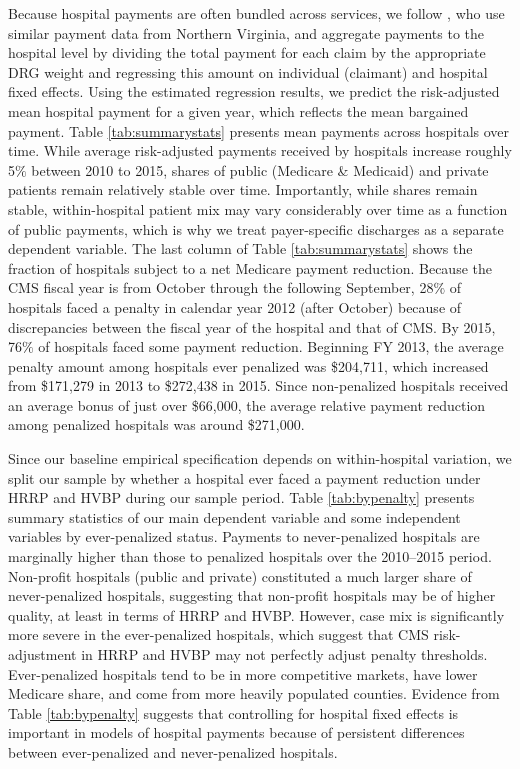 \documentclass[12pt]{article}
\begin{document}
Because hospital payments are often bundled across services, we follow \citet{gowrisankaran2015}, who use similar payment data from Northern Virginia, and aggregate payments to the hospital level by dividing the total payment for each claim by the appropriate DRG weight and regressing this amount on individual (claimant) and hospital fixed effects.  Using the estimated regression results, we predict the risk-adjusted mean hospital payment for a given year, which reflects the mean bargained payment. Table \ref{tab:summarystats} presents mean payments across hospitals over time. While average risk-adjusted payments received by hospitals increase roughly 5$\%$ between 2010 to 2015, shares of public (Medicare \& Medicaid) and private patients remain relatively stable over time.  Importantly, while shares remain stable, within-hospital patient mix may vary considerably over time as a function of public payments, which is why we treat payer-specific discharges as a separate dependent variable.  The last column of Table \ref{tab:summarystats} shows the fraction of hospitals subject to a net Medicare payment reduction.  Because the CMS fiscal year is from October through the following September, 28$\%$ of hospitals faced a penalty in calendar year 2012 (after October) because of discrepancies between the fiscal year of the hospital and that of CMS.  By 2015, 76$\%$ of hospitals faced some payment reduction. Beginning FY 2013, the average penalty amount among hospitals ever penalized was \$204,711, which increased from \$171,279 in 2013 to \$272,438 in 2015. Since non-penalized hospitals received an average bonus of just over \$66,000, the average relative payment reduction among penalized hospitals was around \$271,000.


Since our baseline empirical specification depends on within-hospital variation, we split our sample by whether a hospital ever faced a payment reduction under HRRP and HVBP during our sample period.  Table \ref{tab:bypenalty} presents summary statistics of our main dependent variable and some independent variables by ever-penalized status.  Payments to never-penalized hospitals are marginally higher than those to penalized hospitals over the 2010--2015 period.  Non-profit hospitals (public and private) constituted a much larger share of never-penalized hospitals, suggesting that non-profit hospitals may be of higher quality, at least in terms of HRRP and HVBP.  However, case mix is significantly more severe in the ever-penalized hospitals, which suggest that CMS risk-adjustment in HRRP and HVBP may not perfectly adjust penalty thresholds.  Ever-penalized hospitals tend to be in more competitive markets, have lower Medicare share, and come from more heavily populated counties.  Evidence from Table \ref{tab:bypenalty} suggests that controlling for hospital fixed effects is important in models of hospital payments because of persistent differences between ever-penalized and never-penalized hospitals.
\end{document}
